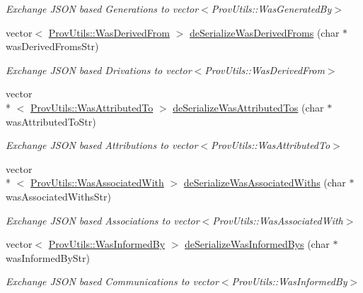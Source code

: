 \begin{DoxyCompactItemize}
\begin{DoxyCompactList}\small\item\em Exchange J\-S\-O\-N based Generations to vector$<$\-Prov\-Utils\-::\-Was\-Generated\-By$>$ \end{DoxyCompactList}\item 
vector$<$ \hyperlink{struct_prov_utils_1_1_was_derived_from}{Prov\-Utils\-::\-Was\-Derived\-From} $>$ \hyperlink{class_in_di_prov_client_ab68be507c04d2e4c27565489f045ac48}{de\-Serialize\-Was\-Derived\-Froms} (char $\ast$was\-Derived\-Froms\-Str)
\begin{DoxyCompactList}\small\item\em Exchange J\-S\-O\-N based Drivations to vector$<$\-Prov\-Utils\-::\-Was\-Derived\-From$>$ \end{DoxyCompactList}\item 
vector\\*
$<$ \hyperlink{struct_prov_utils_1_1_was_attributed_to}{Prov\-Utils\-::\-Was\-Attributed\-To} $>$ \hyperlink{class_in_di_prov_client_a752ed9ff959b75d702f72346111d1676}{de\-Serialize\-Was\-Attributed\-Tos} (char $\ast$was\-Attributed\-To\-Str)
\begin{DoxyCompactList}\small\item\em Exchange J\-S\-O\-N based Attributions to vector$<$\-Prov\-Utils\-::\-Was\-Attributed\-To$>$ \end{DoxyCompactList}\item 
vector\\*
$<$ \hyperlink{struct_prov_utils_1_1_was_associated_with}{Prov\-Utils\-::\-Was\-Associated\-With} $>$ \hyperlink{class_in_di_prov_client_a30ac2a5d87785c8bf7929d508bccf191}{de\-Serialize\-Was\-Associated\-Withs} (char $\ast$was\-Associated\-Withs\-Str)
\begin{DoxyCompactList}\small\item\em Exchange J\-S\-O\-N based Associations to vector$<$\-Prov\-Utils\-::\-Was\-Associated\-With$>$ \end{DoxyCompactList}\item 
vector$<$ \hyperlink{struct_prov_utils_1_1_was_informed_by}{Prov\-Utils\-::\-Was\-Informed\-By} $>$ \hyperlink{class_in_di_prov_client_a9c131081cbb7f6494d6d307d12559ddf}{de\-Serialize\-Was\-Informed\-Bys} (char $\ast$was\-Informed\-By\-Str)
\begin{DoxyCompactList}\small\item\em Exchange J\-S\-O\-N based Communications to vector$<$\-Prov\-Utils\-::\-Was\-Informed\-By$>$ \end{DoxyCompactList}\item 

\end{DoxyCompactItemize}
